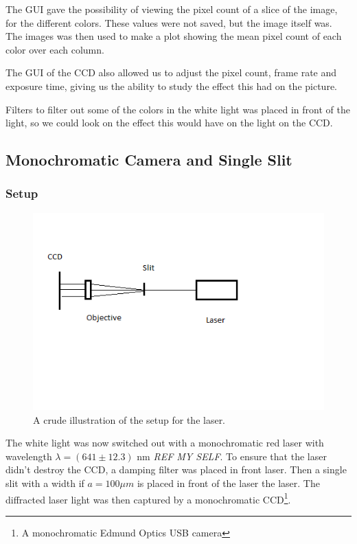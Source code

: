 \documentclass{emulateapj}
\begin{document}
The GUI gave the possibility of viewing the pixel count of a slice of the image, for the different colors. These values were not saved, but the image itself was. The images was then used to make a plot showing the mean pixel count of each color over each column.

The GUI of the CCD also allowed us to adjust the pixel count, frame rate and exposure time, giving us the ability to study the effect this had on the picture.

Filters to filter out some of the colors in the white light was placed in front of the light, so we could look on the effect this would have on the light on the CCD. 


\subsection{Monochromatic Camera and Single Slit}

\subsubsection{Setup}
\label{sec:setup}

\begin{figure}[H]
\centering
\includegraphics[scale=0.4]{setupLaser.png}
\caption{A crude illustration of the setup for the laser.}
\end{figure}

The white light was now switched out with a monochromatic red laser with wavelength $\lambda = (641 \pm 12.3)$ nm \emph{REF MY SELF}. To ensure that the laser didn't destroy the CCD, a damping filter was placed in front laser. Then a single slit with a width if $a = 100\mu m$ is placed in front of the laser the laser. The diffracted laser light was then captured by a monochromatic CCD\footnote{A monochromatic Edmund Optics USB camera}. 
\end{document}
